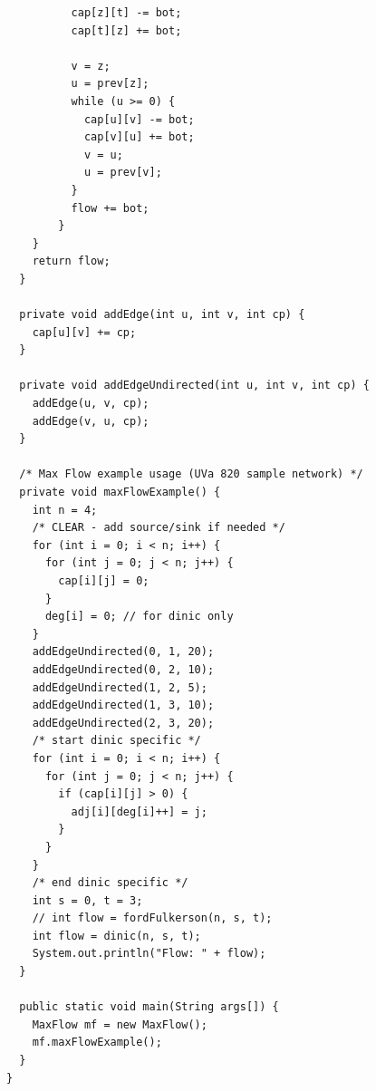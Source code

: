 \documentclass{article}
\begin{document}
\begin{verbatim}
          cap[z][t] -= bot;
          cap[t][z] += bot;

          v = z;
          u = prev[z];
          while (u >= 0) {
            cap[u][v] -= bot;
            cap[v][u] += bot;
            v = u;
            u = prev[v];
          }
          flow += bot;
        }
    }
    return flow;
  }

  private void addEdge(int u, int v, int cp) {
    cap[u][v] += cp;
  }

  private void addEdgeUndirected(int u, int v, int cp) {
    addEdge(u, v, cp);
    addEdge(v, u, cp);
  }

  /* Max Flow example usage (UVa 820 sample network) */
  private void maxFlowExample() {
    int n = 4;
    /* CLEAR - add source/sink if needed */
    for (int i = 0; i < n; i++) {
      for (int j = 0; j < n; j++) {
        cap[i][j] = 0;
      }
      deg[i] = 0; // for dinic only
    }
    addEdgeUndirected(0, 1, 20);
    addEdgeUndirected(0, 2, 10);
    addEdgeUndirected(1, 2, 5);
    addEdgeUndirected(1, 3, 10);
    addEdgeUndirected(2, 3, 20);
    /* start dinic specific */
    for (int i = 0; i < n; i++) {
      for (int j = 0; j < n; j++) {
        if (cap[i][j] > 0) {
          adj[i][deg[i]++] = j;
        }
      }
    }
    /* end dinic specific */
    int s = 0, t = 3;
    // int flow = fordFulkerson(n, s, t);
    int flow = dinic(n, s, t);
    System.out.println("Flow: " + flow);
  }

  public static void main(String args[]) {
    MaxFlow mf = new MaxFlow();
    mf.maxFlowExample();
  }
}

    \end{verbatim}
\end{document}
